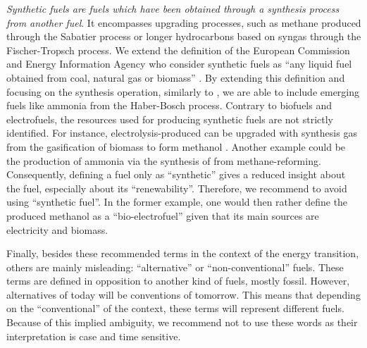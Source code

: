 \textit{Synthetic fuels are fuels which have been obtained through a synthesis process from another fuel}. It encompasses upgrading processes, such as methane produced through the Sabatier process or longer hydrocarbons based on syngas through the Fischer-Tropsch process. We extend the definition of the European Commission and Energy Information Agency who consider synthetic fuels as ``any liquid fuel obtained from coal, natural gas or biomass'' \cite{eia2006, eu_synthetic}. By extending this definition and focusing on the synthesis operation, similarly to \citet{speight2020synthetic}, we are able to include emerging fuels like ammonia from the Haber-Bosch process. Contrary to biofuels and electrofuels, the resources used for producing synthetic fuels are not strictly identified. For instance, electrolysis-produced  can be upgraded with synthesis gas from the gasification of biomass to form methanol \cite{mignard2008}. Another example could be the production of ammonia via the synthesis of  from methane-reforming. Consequently, defining a fuel only as ``synthetic'' gives a reduced insight about the fuel, especially about its ``renewability''. Therefore, we recommend to avoid using ``synthetic fuel''. In the former example, one would then rather define the produced methanol as a ``bio-electrofuel'' given that its main sources are electricity and biomass. 

Finally, besides these recommended terms in the context of the energy transition, others are mainly misleading: ``alternative'' or ``non-conventional'' fuels. These terms are defined in opposition to another kind of fuels, mostly fossil. However, alternatives of today will be conventions of tomorrow. This means that depending on the ``conventional'' of the context, these terms will represent different fuels. Because of this implied ambiguity, we recommend not to use these words as their interpretation is case and time sensitive.

